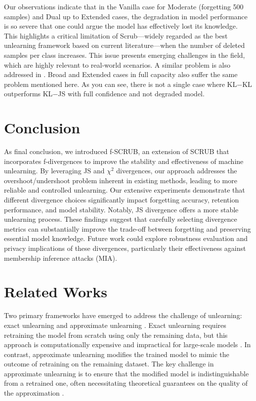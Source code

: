 \documentclass{article} %
\begin{document}
Our observations indicate that in the Vanilla case for Moderate (forgetting 500 samples) and Dual up to Extended cases, the degradation in model performance is so severe that one could argue the model has effectively lost its knowledge. This highlights a critical limitation of Scrub—widely regarded as the best unlearning framework based on current literature—when the number of deleted samples per class increases. This issue presents emerging challenges in the field, which are highly relevant to real-world scenarios. A similar problem is also addressed in \citep{sekhari2021rememberwantforgetalgorithms}. Broad and Extended cases in full capacity also suffer the same problem mentioned here. As you can see, there is not a single case where KL$-$KL outperforms KL$-$JS with full confidence and not degraded model.
\vspace{-0.1in}
\section{Conclusion}
\vspace{-0.1in}
As final conclusion, we introduced f-SCRUB, an extension of SCRUB that incorporates f-divergences to improve the stability and effectiveness of machine unlearning. By leveraging JS and $\chi^2$ divergences, our approach addresses the overshoot/undershoot problem inherent in existing methods, leading to more reliable and controlled unlearning. Our extensive experiments demonstrate that different divergence choices significantly impact forgetting accuracy, retention performance, and model stability. Notably, JS divergence offers a more stable unlearning process. These findings suggest that carefully selecting divergence metrics can substantially improve the trade-off between forgetting and preserving essential model knowledge. Future work could explore robustness evaluation and privacy implications of these divergences, particularly their effectiveness against membership inference attacks (MIA).



\clearpage





\appendix
\newpage
\section{Related Works}

 Two primary frameworks have emerged to address the challenge of unlearning: exact unlearning \citep{cao2015towards} and approximate unlearning \citep{nguyen2020variational}. Exact unlearning requires retraining the model from scratch using only the remaining data, but this approach is computationally expensive and impractical for large-scale models \citep{thudi2022unrolling}. In contrast, approximate unlearning modifies the trained model to mimic the outcome of retraining on the remaining dataset. The key challenge in approximate unlearning is to ensure that the modified model is indistinguishable from a retrained one, often necessitating theoretical guarantees on the quality of the approximation \citep{guo2019certified}.
\end{document}
